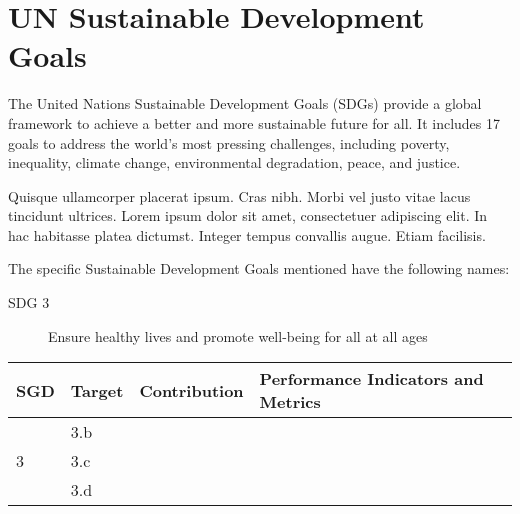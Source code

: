 \chapter*{UN Sustainable Development Goals} \label{chap:UnitedNations}

The United Nations Sustainable Development Goals (SDGs) provide a global framework to achieve a better and more sustainable future for all. 
It includes 17 goals to address the world's most pressing challenges, including poverty, inequality, climate change, environmental degradation, peace, and justice. 

Quisque ullamcorper placerat ipsum. Cras nibh. Morbi vel justo vitae lacus tincidunt ultrices.
Lorem ipsum dolor sit amet, consectetuer adipiscing elit. 
In hac habitasse platea dictumst. Integer tempus convallis augue. Etiam facilisis. 

The specific Sustainable Development Goals mentioned have the following names:

\begin{description}
\item [SDG 3]
Ensure healthy lives and promote well-being for all at all ages
\end{description}

\begin{center}
\begin{tabular}{|l|l|p{58mm}|p{52mm}|}
\hline
\textbf{SGD} & \textbf{Target} & \textbf{Contribution} & \textbf{Performance Indicators and Metrics} \\ 
\hline
\hline
    \multirow{3}{*}{3} & 3.b & & \\
    \cline{2-4}
    & 3.c & & \\
    \cline{2-4}
    & 3.d & & \\
\hline
\end{tabular}
\end{center}